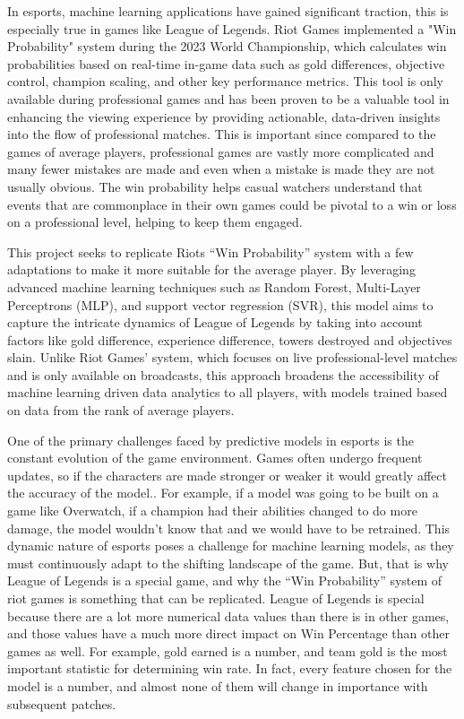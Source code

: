 \documentclass[10pt,twocolumn]{article}
\begin{document}
In esports, machine learning applications have gained significant traction, this is especially true in games like League of Legends. Riot Games implemented a "Win Probability" system during the 2023 World Championship, which calculates win probabilities based on real-time in-game data such as gold differences, objective control, champion scaling, and other key performance metrics. This tool is only available during professional games and has been proven to be a valuable tool in enhancing the viewing experience by providing actionable, data-driven insights into the flow of professional matches. This is important since compared to the games of average players, professional games are vastly more complicated and many fewer mistakes are made and even when a mistake is made they are not usually obvious. The win probability helps casual watchers understand that events that are commonplace in their own games could be pivotal to a win or loss on a professional level, helping to keep them engaged.

This project seeks to replicate Riots “Win Probability” \cite{Xu2023}system with a few adaptations to make it more suitable for the average player. By leveraging advanced machine learning techniques such as Random Forest, Multi-Layer Perceptrons (MLP), and support vector regression (SVR), this model aims to capture the intricate dynamics of League of Legends by taking into account factors like gold difference, experience difference, towers destroyed and objectives slain. Unlike Riot Games' system, which focuses on live professional-level matches and is only available on broadcasts, this approach broadens the accessibility of machine learning driven data analytics to all players, with models trained based on data from the rank of average players.

One of the primary challenges faced by predictive models in esports is the constant evolution of the game environment. Games often undergo frequent updates, so if the characters are made stronger or weaker it would greatly affect the accuracy of the model.. For example, if a model was going to be built on a game like Overwatch, if a champion had their abilities changed to do more damage, the model wouldn’t know that and we would have to be retrained. This dynamic nature of esports poses a challenge for machine learning models, as they must continuously adapt to the shifting landscape of the game. But, that is why League of Legends is a special game, and why the “Win Probability” system of riot games is something that can be replicated. League of Legends is special because there are a lot more numerical data values than there is in other games, and those values have a much more direct impact on Win Percentage than other games as well. For example, gold earned is a number, and team gold is the most important statistic for determining win rate. In fact, every feature chosen for the model is a number, and almost none of them will change in importance with subsequent patches.
\end{document}
